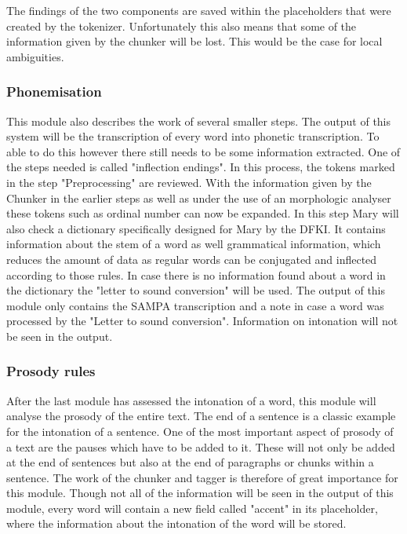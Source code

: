 \documentclass[a4paper, 12pt]{article}
\begin{document}
The findings of the two components are saved within the placeholders that were created by the tokenizer.
Unfortunately this also means that some of the information given by the chunker will be lost. This would be the case for local ambiguities.


\subsubsection*{Phonemisation}

This module also describes the work of several smaller steps.
The output of this system will be the transcription of every word into phonetic transcription.
To able to do this however there still needs to be some information extracted.
One of the steps needed is called "inflection endings".
In this process, the tokens marked in the step "Preprocessing" are reviewed.
With the information given by the Chunker in the earlier steps as well as under the use of an morphologic analyser these tokens such as ordinal number can now be expanded.\newline
\indent In this step Mary will also check a dictionary specifically designed for Mary by the DFKI.
It contains information about the stem of a word as well grammatical information, which reduces the amount of data as regular words can be conjugated and inflected according to those rules.
In case there is no information found about a word in the dictionary the "letter to sound conversion" will be used.
The output of this module only contains the SAMPA transcription and a note in case a word was processed by the "Letter to sound conversion".
Information on intonation will not be seen in the output.

\subsubsection*{Prosody rules}

After the last module has assessed the intonation of a word, this module will analyse the prosody of the entire text.
The end of a sentence is a classic example for the intonation of a sentence. One of the most important aspect of prosody of a text are the pauses which have to be added to it.
These will not only be added at the end of sentences but also at the end of paragraphs or chunks within a sentence.
The work of the chunker and tagger is therefore of great importance for this module.
\newline
\indent Though not all of the information will be seen in the output of this module, every word will contain a new field called "accent" in its placeholder, where the information about the intonation of the word will be stored.
\end{document}
